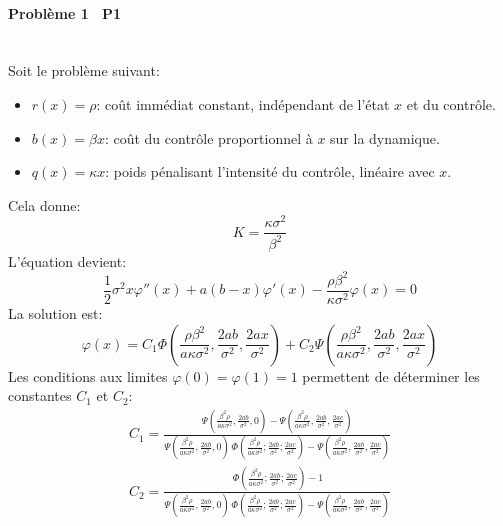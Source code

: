 \paragraph{Problème 1 \textemdash~P1}\label{p1}\phantom{}\\
\noindent Soit le problème suivant: 
\begin{itemize}
    \item $r(x) = \rho$: coût immédiat constant, indépendant de l'état $x$ et du contrôle.
    \item $b(x) = \beta x$: coût du contrôle proportionnel à $x$ sur la dynamique.
    \item $q(x) = \kappa x$: poids pénalisant l'intensité du contrôle, linéaire avec $x$.
\end{itemize}

Cela donne:
\[
K=\frac{\kappa \sigma^2}{\beta^2}
\]
L'équation devient:
\begin{equation}\label{eq_exemple1}
    \frac{1}{2}\sigma^2 x\varphi''(x) + a(b - x)\varphi'(x) - \frac{\rho\beta^2}{\kappa \sigma^2}\varphi(x) = 0
\end{equation}
La solution est:
\[
\varphi(x)=C_1\Phi\left(\frac{\rho\beta^2}{a\kappa \sigma^2},\frac{2ab}{\sigma^2},\frac{2ax}{\sigma^2}\right) + C_2\Psi\left(\frac{\rho\beta^2}{a\kappa \sigma^2},\frac{2ab}{\sigma^2},\frac{2ax}{\sigma^2}\right)
\]
Les conditions aux limites $\varphi(0)=\varphi(1)=1$ permettent de déterminer les constantes $C_1$ et $C_2$:
\begin{equation}\label{control_constants}
    \begin{aligned}
        C_1=\frac{\Psi\left(\frac{\beta ^2 \rho }{a \kappa  \sigma ^2},\frac{2 a b}{\sigma ^2},0\right)-\Psi\left(\frac{\beta ^2 \rho }{a \kappa  \sigma ^2},\frac{2 a b}{\sigma ^2},\frac{2 a c}{\sigma ^2}\right)}{\Psi\left(\frac{\beta ^2 \rho }{a \kappa  \sigma ^2},\frac{2 a b}{\sigma ^2},0\right) \, \Phi\left(\frac{\beta ^2 \rho }{a \kappa  \sigma ^2};\frac{2 a b}{\sigma ^2};\frac{2 a c}{\sigma ^2}\right)-\Psi\left(\frac{\beta ^2 \rho }{a \kappa  \sigma ^2},\frac{2 a b}{\sigma ^2},\frac{2 a c}{\sigma ^2}\right)} \\
        C_2= \frac{\, \Phi\left(\frac{\beta ^2 \rho }{a \kappa  \sigma ^2};\frac{2 a b}{\sigma ^2};\frac{2 a c}{\sigma ^2}\right)-1}{\Psi\left(\frac{\beta ^2 \rho }{a \kappa  \sigma ^2},\frac{2 a b}{\sigma ^2},0\right) \, \Phi\left(\frac{\beta ^2 \rho }{a \kappa  \sigma ^2};\frac{2 a b}{\sigma ^2};\frac{2 a c}{\sigma ^2}\right)-\Psi\left(\frac{\beta ^2 \rho }{a \kappa  \sigma ^2},\frac{2 a b}{\sigma ^2},\frac{2 a c}{\sigma ^2}\right)}
    \end{aligned}
\end{equation}

